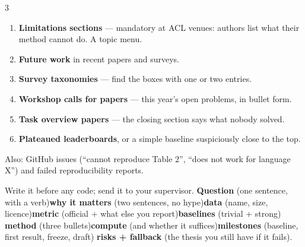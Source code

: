 \documentclass[10pt,a4paper]{article}
\begin{document}
\begin{multicols}{3}
\begin{enumerate}
  \item \textbf{Limitations sections} --- mandatory at ACL venues: authors list
        what their method cannot do. A topic menu.
  \item \textbf{Future work} in recent papers and surveys.
  \item \textbf{Survey taxonomies} --- find the boxes with one or two entries.
  \item \textbf{Workshop calls for papers} --- this year's open problems, in
        bullet form.
  \item \textbf{Task overview papers} --- the closing section says what nobody
        solved.
  \item \textbf{Plateaued leaderboards}, or a simple baseline suspiciously
        close to the top.
\end{enumerate}
Also: GitHub issues (``cannot reproduce Table 2'', ``does not work for language
X'') and failed reproducibility reports.

Write it before any code; send it to your supervisor.
\textbf{Question} (one sentence, with a verb)\dt \textbf{why it matters} (two
sentences, no hype)\dt \textbf{data} (name, size, licence)\dt \textbf{metric}
(official + what else you report)\dt \textbf{baselines} (trivial + strong)\dt
\textbf{method} (three bullets)\dt \textbf{compute} (and whether it
suffices)\dt \textbf{milestones} (baseline, first result, freeze, draft)\dt
\textbf{risks + fallback} (the thesis you still have if it fails).


\end{multicols}
\end{document}
